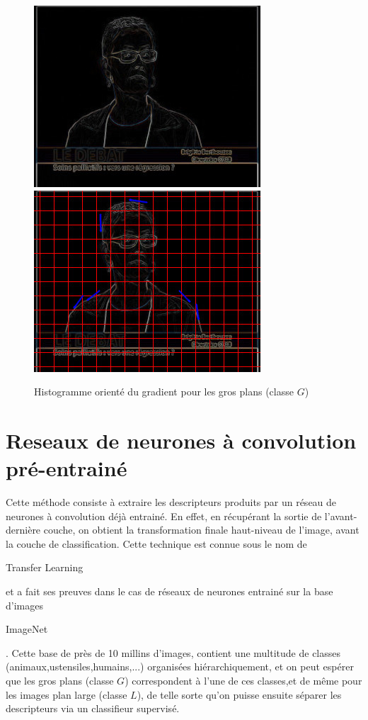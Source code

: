 \documentclass{book}
\begin{document}
\begin{figure}[H]
\begin{center}
\includegraphics[scale=0.3]{hog_exemple2_contour.jpg}
\includegraphics[scale=0.3]{hog_exemple2_gradient.jpg}
\end{center}
\caption{Histogramme orienté du gradient pour les gros plans (classe $G$)}
\label{hog_classeG}
\end{figure}

\section{Reseaux de neurones à convolution pré-entrainé}

Cette méthode consiste à extraire les descripteurs produits par un réseau de neurones à convolution déjà entrainé.
En effet, en récupérant la sortie de l'avant-dernière couche, on obtient la transformation finale haut-niveau de l'image, 
avant la couche de classification.
Cette technique est connue sous le nom de \begin{itshape}Transfer Learning\end{itshape} \cite{DBLP:journals/corr/YosinskiCBL14} 
et a fait ses preuves dans le cas de réseaux de neurones entrainé sur la base 
d'images \begin{itshape}ImageNet\end{itshape} \cite{imagenet_cvpr09}.
Cette base de près de 10 millins d'images, contient une multitude de classes (animaux,ustensiles,humains,...) organisées hiérarchiquement, 
et on peut espérer que les gros plans (classe $G$) correspondent à l'une de ces classes,et de même pour les images plan 
large (classe $L$), de telle sorte qu'on puisse ensuite séparer les descripteurs via un classifieur 
supervisé.
\end{document}
